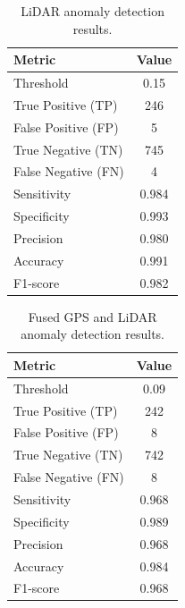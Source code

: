 \documentclass[a4paper]{article}
\begin{document}
      \begin{table}[H]
         \centering
         \caption{LiDAR anomaly detection results.}
         \begin{tabular}{lc}
            \hline
            Metric & Value \\
            \hline
            Threshold & 0.15 \\
            True Positive (TP) & 246 \\
            False Positive (FP) & 5 \\
            True Negative (TN) & 745 \\
            False Negative (FN) & 4 \\
            Sensitivity & 0.984 \\
            Specificity & 0.993 \\
            Precision & 0.980 \\
            Accuracy & 0.991 \\
            F1-score & 0.982 \\
            \hline
         \end{tabular}
      \end{table}

      \begin{table}[H]
         \centering
         \caption{Fused GPS and LiDAR anomaly detection results.}
         \begin{tabular}{lc}
            \hline
            Metric & Value \\
            \hline
            Threshold & 0.09 \\
            True Positive (TP) & 242 \\
            False Positive (FP) & 8 \\
            True Negative (TN) & 742 \\
            False Negative (FN) & 8 \\
            Sensitivity & 0.968 \\
            Specificity & 0.989 \\
            Precision & 0.968 \\
            Accuracy & 0.984 \\
            F1-score & 0.968 \\
            \hline
         \end{tabular}
      \end{table}
      
      
\end{document}
